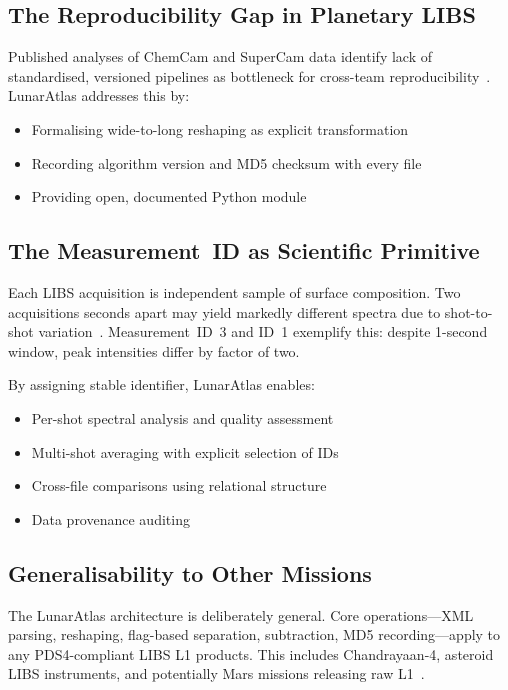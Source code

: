 \documentclass[a4paper,twocolumn,10pt]{article}
\begin{document}
\subsection{The Reproducibility Gap in Planetary LIBS}

Published analyses of ChemCam and SuperCam data identify lack of
standardised, versioned pipelines as bottleneck for cross-team
reproducibility~\cite{Anderson2022,Clegg2017}. LunarAtlas addresses
this by:
\begin{itemize}[nosep,leftmargin=*]
  \item Formalising wide-to-long reshaping as explicit transformation
  \item Recording algorithm version and MD5 checksum with every file
  \item Providing open, documented Python module
\end{itemize}

\subsection{The Measurement~ID as Scientific Primitive}

Each LIBS acquisition is independent sample of surface composition.
Two acquisitions seconds apart may yield markedly different spectra
due to shot-to-shot variation~\cite{Wiens2012}. Measurement~ID~3 and
ID~1 exemplify this: despite 1-second window, peak intensities differ
by factor of two.

By assigning stable identifier, LunarAtlas enables:
\begin{itemize}[nosep,leftmargin=*]
  \item Per-shot spectral analysis and quality assessment
  \item Multi-shot averaging with explicit selection of IDs
  \item Cross-file comparisons using relational structure
  \item Data provenance auditing
\end{itemize}

\subsection{Generalisability to Other Missions}

The LunarAtlas architecture is deliberately general. Core
operations---XML parsing, reshaping, flag-based separation,
subtraction, MD5 recording---apply to any PDS4-compliant LIBS L1
products. This includes Chandrayaan-4, asteroid LIBS instruments, and
potentially Mars missions releasing raw L1~\cite{Saeidfirozeh2024}.
\end{document}
